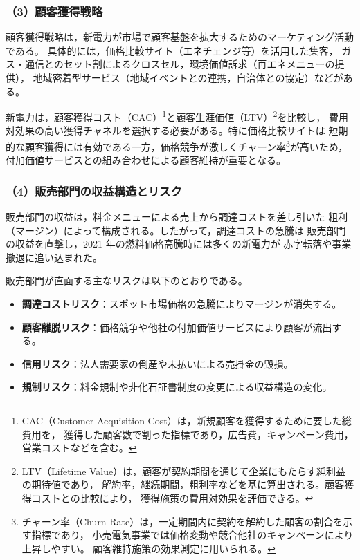 \subsubsection*{\hspace{2em}（3）顧客獲得戦略}

顧客獲得戦略は，新電力が市場で顧客基盤を拡大するためのマーケティング活動である。
具体的には，価格比較サイト（エネチェンジ等）を活用した集客，
ガス・通信とのセット割によるクロスセル，環境価値訴求（再エネメニューの提供），
地域密着型サービス（地域イベントとの連携，自治体との協定）などがある。

新電力は，顧客獲得コスト（CAC）\footnote{
CAC（Customer Acquisition Cost）は，新規顧客を獲得するために要した総費用を，
獲得した顧客数で割った指標であり，広告費，キャンペーン費用，営業コストなどを含む。
}と顧客生涯価値（LTV）\footnote{
LTV（Lifetime Value）は，顧客が契約期間を通じて企業にもたらす純利益の期待値であり，
解約率，継続期間，粗利率などを基に算出される。顧客獲得コストとの比較により，
獲得施策の費用対効果を評価できる。
}を比較し，
費用対効果の高い獲得チャネルを選択する必要がある。特に価格比較サイトは
短期的な顧客獲得には有効である一方，価格競争が激しくチャーン率\footnote{
チャーン率（Churn Rate）は，一定期間内に契約を解約した顧客の割合を示す指標であり，
小売電気事業では価格変動や競合他社のキャンペーンにより上昇しやすい。
顧客維持施策の効果測定に用いられる。
}が高いため，
付加価値サービスとの組み合わせによる顧客維持が重要となる。


\subsubsection*{\hspace{2em}（4）販売部門の収益構造とリスク}

販売部門の収益は，料金メニューによる売上から調達コストを差し引いた
粗利（マージン）によって構成される。したがって，調達コストの急騰は
販売部門の収益を直撃し，2021 年の燃料価格高騰時には多くの新電力が
赤字転落や事業撤退に追い込まれた。

販売部門が直面する主なリスクは以下のとおりである。

\begin{itemize}
  \item \textbf{調達コストリスク}：スポット市場価格の急騰によりマージンが消失する。
  \item \textbf{顧客離脱リスク}：価格競争や他社の付加価値サービスにより顧客が流出する。
  \item \textbf{信用リスク}：法人需要家の倒産や未払いによる売掛金の毀損。
  \item \textbf{規制リスク}：料金規制や非化石証書制度の変更による収益構造の変化。
\end{itemize}

